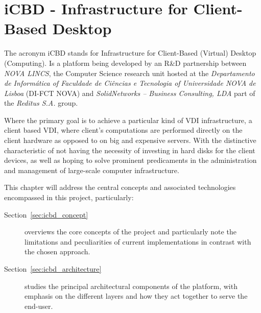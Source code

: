 

\chapter{iCBD - Infrastructure for Client-Based Desktop}
\label{cha:icbd}

The acronym \gls{iCBD} stands for Infrastructure for Client-Based (Virtual) Desktop (Computing). Is a platform being developed by an R\&D partnership between \textit{NOVA LINCS}, the Computer Science research unit hosted at the \textit{Departamento de Informática of Faculdade de Ciências e Tecnologia of Universidade NOVA de Lisboa} (DI-FCT NOVA) and \textit{SolidNetworks – Business Consulting, LDA} part of the \textit{Reditus S.A.} group. 

Where the primary goal is to achieve a particular kind of \gls{VDI} infrastructure, a client based VDI, where client's computations are performed directly on the client hardware as opposed to on big and expensive servers. With the distinctive characteristic of not having the necessity of investing in hard disks for the client devices, as well as hoping to solve prominent predicaments in the administration and management of large-scale computer infrastructure.

This chapter will address the central concepts and associated technologies encompassed in this project, particularly:

\begin{description}
	\item [Section~\ref{sec:icbd_concept}] overviews the core concepts of the project and particularly note the limitations and peculiarities of current implementations in contrast with the chosen approach.
	\item [Section~\ref{sec:icbd_architecture}] studies the principal architectural components of the platform, with emphasis on the different layers and how  they act together to serve the end-user.
\end{description}
\newpage



